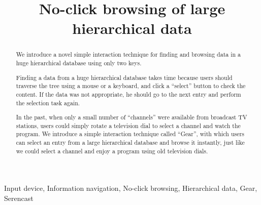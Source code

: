 \documentclass[conference]{IEEEtran}
\begin{document}
\title{No-click browsing of large hierarchical data}
%
%

\author{
\and
{}
}

\maketitle

\begin{abstract}
We introduce a novel simple interaction technique for finding and browsing
data in a huge hierarchical database using only two keys.

Finding a data from a huge hierarchical database takes time
because users should traverse the tree using a mouse or a keyboard,
and click a ``select'' button to check the content.
If the data was not appropriate,
he should go to the next entry and perform the selection task again.

In the past, when only a small number of ``channels'' were available
from broadcast TV stations, users could simply rotate
a television dial to select a channel and watch the program.
We introduce a simple interaction technique called ``Gear'',
with which users can select an entry from a large hierarchical database and
browse it instantly, just like we could select a channel and enjoy a program
using old television dials.
\end{abstract}

\begin{IEEEkeywords}
  Input device, Information navigation, No-click browsing,
  Hierarchical data, Gear, Serencast
\end{IEEEkeywords}

\end{document}
